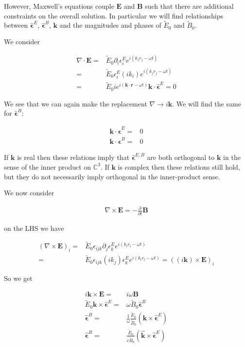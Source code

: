 \documentclass[12pt]{article}
\newcommand{\ep}{\epsilon}
\renewcommand{\vec}[1]{\boldsymbol{#1}}
\newcommand{\unitvec}[1]{\hat{\boldsymbol{#1}}}
\begin{document}
However, Maxwell's equations couple $\vec{E}$ and $\vec{B}$ such that there are additional constraints on the overall solution. 
In particular we will find relationships between $\unitvec{\ep}^E$, $\unitvec{\ep}^B$, $\vec{k}$ and the magnitudes and phases of $\tilde{E}_0$ and $\tilde{B}_0$.

We consider

\begin{align}
\nabla \cdot \vec{E} =& \tilde{E}_0 \partial_i \ep_i^E e^{i (k_j r_j - \omega t)}\\
=& \tilde{E}_0 \ep_i^E (ik_i) e^{i(k_jr_j-\omega t)}\\
=& \tilde{E}_0 i e^{i(\vec{k}\cdot\vec{r} - \omega t)} \vec{k}\cdot \unitvec{\ep}^E = 0
\end{align}

We see that we can again make the replacement $\nabla \rightarrow i\vec{k}$.
We will find the same for $\unitvec{\ep}^B$:

\begin{align}
\vec{k} \cdot \unitvec{\ep}^E =& 0\\
\vec{k} \cdot \unitvec{\ep}^B =& 0
\end{align}

If $\vec{k}$ is real then these relations imply that $\unitvec{\ep}^{E,B}$ are both orthogonal to $\vec{k}$ in the sense of the inner product on $\mathbb{C}^3$.
If $\vec{k}$ is complex then these relations still hold, but they do not necessarily imply orthogonal in the inner-product sense.

We now consider

\begin{align}
\nabla \times \vec{E} = -\frac{\partial}{\partial t} \vec{B}
\end{align}

on the LHS we have

\begin{align}
\left(\nabla \times \vec{E}\right)_i =& \tilde{E}_0 \ep_{ijk} \partial_j \ep_k^E e^{i(k_lr_l - \omega t)}\\
=& \tilde{E}_0 \ep_{ijk} (ik_j) \ep_k^E e^{i(k_lr_l - \omega t)} = \left((i\vec{k})\times \vec{E}\right)_i
\end{align}

So we get

\begin{align}
i\vec{k}\times  \vec{E} =& i\omega \vec{B}\\
\tilde{E}_0 \vec{k}\times \unitvec{\ep}^E =& \omega \tilde{B}_0 \unitvec{\ep}^B\\
\unitvec{\ep}^B =& \frac{1}{\omega}\frac{\tilde{E}_0}{\tilde{B}_0} \left(\vec{k}\times \unitvec{\ep}^E\right)\\
\unitvec{\ep}^B =& \frac{\tilde{E}_0}{c\tilde{B}_0} \left(\unitvec{k}\times\unitvec{\ep}^E\right)
\end{align}
\end{document}
